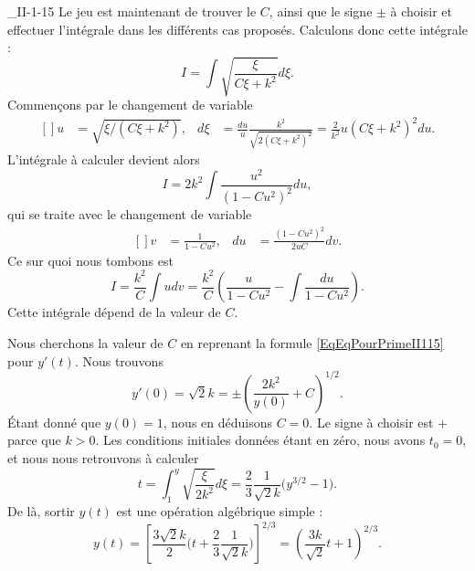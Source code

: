 \begin{corrige}{_II-1-15}
Le jeu est maintenant de trouver le $C$, ainsi que le signe $\pm$ à choisir et effectuer l'intégrale dans les différents cas proposés. Calculons donc cette intégrale :
\begin{equation}
	I=\int\sqrt{\frac{ \xi }{ C\xi+k^2 }}d\xi.
\end{equation}
Commençons par le changement de variable 
\begin{equation}
	\begin{aligned}[]
		u&=\sqrt{\xi/(C\xi+k^2)},	&	d\xi&=\frac{ du }{ u }\frac{ k^2 }{ \sqrt{2(C\xi+k^2)^2} }=\frac{ 2 }{ k^2 }u(C\xi+k^2)^2du.
	\end{aligned}
\end{equation}
L'intégrale à calculer devient alors
\begin{equation}
	I=2k^2\int\frac{ u^2 }{ (1-Cu^2)^2 }du,
\end{equation}
qui se traite avec le changement de variable
\begin{equation}
	\begin{aligned}[]
		v&=\frac{ 1 }{ 1-Cu^2 },	&du&=\frac{ (1-Cu^2)^2 }{ 2uC }dv.
	\end{aligned}
\end{equation}
Ce sur quoi nous tombons est
\begin{equation}		\label{IntII115avecC}
	I=\frac{ k^2 }{ C }\int udv=\frac{ k^2 }{ C }\left( \frac{ u }{ 1-Cu^2 } -\int\frac{ du }{ 1-Cu^2 } \right).
\end{equation}
Cette intégrale dépend de la valeur de $C$.


Nous cherchons la valeur de $C$ en reprenant la formule \eqref{EqEqPourPrimeII115} pour $y'(t)$. Nous trouvons
\begin{equation}
	y'(0)=\sqrt{2}k=\pm\left( \frac{ 2k^2 }{ y(0) }+C \right)^{1/2}.
\end{equation}
Étant donné que $y(0)=1$, nous en déduisons $C=0$. Le signe à choisir est $+$ parce que $k>0$. Les conditions initiales données étant en zéro, nous avons $t_0=0$, et nous nous retrouvons à calculer
\begin{equation}
	t=\int_1^y\sqrt{\frac{ \xi }{ 2k^2 }}d\xi=\frac{ 2 }{ 3 }\frac{1}{ \sqrt{2}k }\big( y^{3/2}-1 \big).
\end{equation}
De là, sortir $y(t)$ est une opération algébrique simple :
\begin{equation}
	y(t)=\left[ \frac{ 3\sqrt{2}k }{ 2 }\Big( t+\frac{ 2 }{ 3 }\frac{ 1 }{ \sqrt{2}k } \Big)    \right]^{2/3}=\left( \frac{ 3k }{ \sqrt{2} }t+1 \right)^{2/3}.
\end{equation}


\end{corrige}
